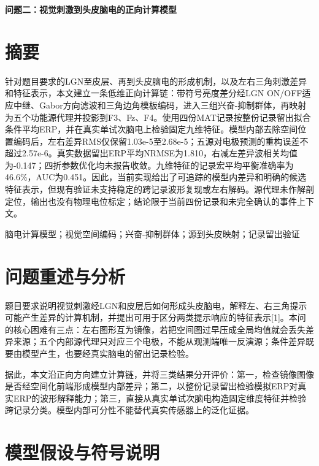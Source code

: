\documentclass[12pt,a4paper]{article}
\begin{document}
\thispagestyle{plain}
\begin{center}
  {\fontsize{16pt}{24pt}\selectfont\bfseries\heitifont 问题二：视觉刺激到头皮脑电的正向计算模型\par}
\end{center}
\section*{摘\quad 要}
针对题目要求的LGN至皮层、再到头皮脑电的形成机制，以及左右三角刺激差异和特征表示，本文建立一条低维正向计算链：带符号亮度差分经LGN ON/OFF适应中继、Gabor方向滤波和三角边角模板编码，进入三组兴奋-抑制群体，再映射为五个功能源代理并投影到F3、Fz、F4。使用四份MAT记录按整份记录留出拟合条件平均ERP，并在真实单试次脑电上检验固定九维特征。模型内部去除空间位置编码后，左右差异RMS仅保留1.03e-5至2.68e-5；五源对电极预测的重构误差不超过2.57e-6。真实数据留出ERP平均NRMSE为1.810，右减左差异波相关均值为-0.147；四折参数优化均未报告收敛。九维特征的记录宏平均平衡准确率为46.6\%，AUC为0.451。因此，当前实现给出了可追踪的模型内差异和明确的候选特征表示，但现有验证未支持稳定的跨记录波形复现或左右解码。源代理未作解剖定位，输出也没有物理电位标定；结论限于当前四份记录和未完全确认的事件上下文。

脑电计算模型；视觉空间编码；兴奋-抑制群体；源到头皮映射；记录留出验证

\newpage
\tableofcontents
\newpage
{}\setcounter{page}{1}

\hypertarget{ux95eeux9898ux91cdux8ff0ux4e0eux5206ux6790}{%
\section{问题重述与分析}\label{ux95eeux9898ux91cdux8ff0ux4e0eux5206ux6790}}

题目要求说明视觉刺激经LGN和皮层后如何形成头皮脑电，解释左、右三角提示可能产生差异的计算机制，并提出可用于区分两类提示响应的特征表示{[}1{]}。本问的核心困难有三点：左右图形互为镜像，若把空间图过早压成全局均值就会丢失差异来源；五个内部源代理只对应三个电极，不能从观测端唯一反演源；条件差异既要由模型产生，也要经真实脑电的留出记录检验。

据此，本文沿正向方向建立计算链，并将三类结果分开评价：第一，检查镜像图像是否经空间化前端形成模型内部差异；第二，以整份记录留出检验模拟ERP对真实ERP的波形解释能力；第三，直接从真实单试次脑电构造固定维度特征并检验跨记录分类。模型内部可分性不能替代真实传感器上的泛化证据。

\hypertarget{ux6a21ux578bux5047ux8bbeux4e0eux7b26ux53f7ux8bf4ux660e}{%
\section{模型假设与符号说明}\label{ux6a21ux578bux5047ux8bbeux4e0eux7b26ux53f7ux8bf4ux660e}}
\end{document}
